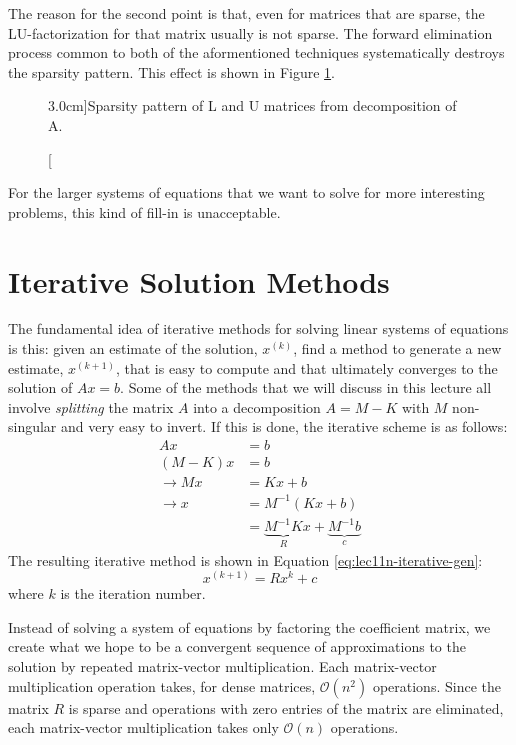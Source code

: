 The reason for the second point is that, even for matrices that are sparse, the LU-factorization for that matrix usually is not sparse.  The forward elimination process common to both of the aformentioned techniques systematically destroys the sparsity pattern.  This effect is shown in Figure \ref{fig:lec11n-LandU}.
\begin{figure}[h!]
\label{fig:lec11n-LandU}
\caption[][3.0cm]{Sparsity pattern of L and U matrices from decomposition of A.}
\end{figure}

\noindent For the larger systems of equations that we want to solve for more interesting problems, this kind of fill-in is unacceptable.

\section{Iterative Solution Methods}

The fundamental idea of iterative methods for solving linear systems of equations is this: given an estimate of the solution, $x^(k)$, find a method to generate a new estimate, $x^{(k+1)}$, that is easy to compute and that ultimately converges to the solution of $Ax=b$.  Some of the methods that we will discuss in this lecture all involve \emph{splitting} the matrix $A$ into a decomposition $A=M-K$ with $M$ non-singular and very easy to invert.  If this is done, the iterative scheme is as follows:
\begin{align*}
Ax &= b \\
(M-K)x &= b \\
\rightarrow Mx &= Kx + b \\
\rightarrow x &= M^{-1}(Kx + b) \\
&= \underbrace{M^{-1}K}_{R}x + \underbrace{M^{-1}b}_{c}
\end{align*} 
The resulting iterative method is shown in Equation \ref{eq:lec11n-iterative-gen}:
\begin{equation}
x^{(k+1)} = Rx^{k} + c
\label{eq:lec11n-iterative-gen}
\end{equation}
where $k$ is the iteration number.

Instead of solving a system of equations by factoring the coefficient matrix, we create what we hope to be a convergent sequence of approximations to the solution by repeated matrix-vector multiplication.  Each matrix-vector multiplication operation takes, for dense matrices, $\mathcal{O}(n^2)$ operations.  Since the matrix $R$ is sparse and operations with zero entries of the matrix are eliminated, each matrix-vector multiplication takes only $\mathcal{O}(n)$ operations.

